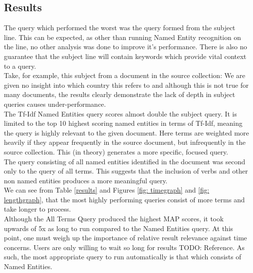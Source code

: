 \documentclass{l4proj}
\begin{document}
\subsection{Results}
The query which performed the worst was the query formed from the subject line. This can be expected, as other than running Named Entity recognition on the line, no other analysis was done to improve it's performance. There is also no guarantee that the subject line will contain keywords which provide vital context to a query.\\
Take, for example, this subject from a document in the source collection:
We are given no insight into which country this refers to and although this is not true for many documents, the results clearly demonstrate the lack of depth in subject queries causes under-performance.\\
The Tf-Idf Named Entities query scores almost double the subject query. It is limited to the top 10 highest scoring named entities in terms of Tf-Idf, meaning the query is highly relevant to the given document. Here terms are weighted more heavily if they appear frequently in the source document, but infrequently in the source collection. This (in theory) generates a more specific, focused query. \\
The query consisting of all named entities identified in the document was second only to the query of all terms. This suggests that the inclusion of verbs and other non named entities produces a more meaningful query.\\
We can see from Table \ref{results} and Figures \ref{fig: timegraph} and \ref{fig: lengthgraph}, that the most highly performing queries consist of more terms and take longer to process.\\
Although the All Terms Query produced the highest MAP scores, it took upwards of 5x as long to run compared to the Named Entities query. At this point, one must weigh up the importance of relative result relevance against time concerns. Users are only willing to wait so long for results TODO: Reference. As such, the most appropriate query to run automatically is that which consists of Named Entities.
\end{document}
